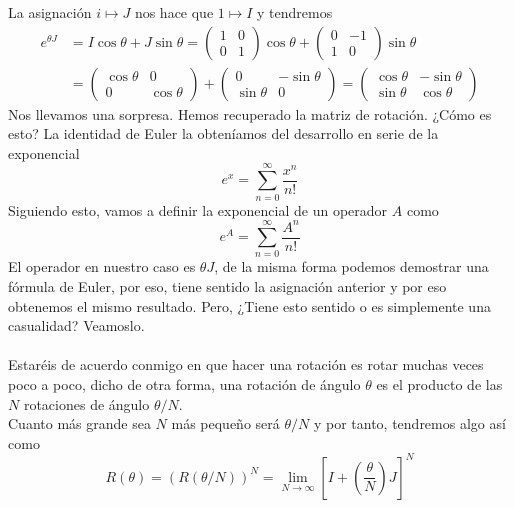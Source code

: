 \documentclass[12pt]{article}
\begin{document}
La asignación $i\mapsto J$ nos hace que $1\mapsto I$  y tendremos
\begin{equation*}
    \begin{split}
         e^{\theta J} & = I \cos\theta+ J\sin\theta = \begin{pmatrix}
        1 & 0 \\ 0 & 1 
    \end{pmatrix} \cos \theta + \begin{pmatrix}
        0 & -1 \\ 1 & 0 
    \end{pmatrix} \sin\theta  \\
    & =  \begin{pmatrix}
        \cos\theta & 0 \\ 0 & \cos \theta 
    \end{pmatrix}+ \begin{pmatrix}
        0 & -\sin \theta \\ \sin\theta & 0 
    \end{pmatrix}= \begin{pmatrix}
        \cos \theta  & -\sin\theta \\ \sin \theta & \cos\theta 
    \end{pmatrix}
    \end{split}
\end{equation*}
Nos llevamos una sorpresa. Hemos recuperado la matriz de rotación. ¿Cómo es esto? La identidad de Euler la obteníamos del desarrollo en serie de la exponencial 
\begin{equation}
    e^x=\sum_{n=0}^{\infty} \frac{x^n}{n!}
\end{equation}
Siguiendo esto, vamos a definir la exponencial de un operador $A$ como 
\begin{equation}
    e^A=\sum_{n=0}^{\infty} \frac{A^n}{n!}
\end{equation}
El operador en nuestro caso es $\theta J$, de la misma forma podemos demostrar una fórmula de Euler, por eso, tiene sentido la asignación anterior y por eso obtenemos el mismo resultado. Pero, ¿Tiene esto sentido o es simplemente una casualidad? Veamoslo. \\\\
Estaréis de acuerdo conmigo en que hacer una rotación es rotar muchas veces poco a poco, dicho de otra forma, una rotación de ángulo $\theta$ es el producto de las $N$ rotaciones de ángulo $\theta/N$.
$$ $$
Cuanto más grande sea $N$ más pequeño será $\theta/N$ y por tanto, tendremos algo así como 
\begin{equation*}
   R(\theta) = (R(\theta/N))^N= \lim_{N\rightarrow \infty} \left[I + \left(\frac{\theta}{N} \right) J\right]^N
\end{equation*}
\end{document}
